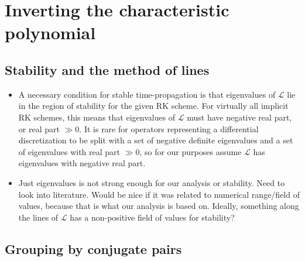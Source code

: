 \documentclass[a4paper,10pt]{article}
\begin{document}
\section{Inverting the characteristic polynomial}

\subsection{Stability and the method of lines}

{\color{blue}
\begin{itemize}

\item A necessary condition for stable time-propagation is that eigenvalues of $\mathcal{L}$
lie in the region of stability for the given RK scheme. For virtually all implicit RK schemes,
this means that eigenvalues of $\mathcal{L}$ must have negative real part, or real part
$\gg 0$. It is rare for operators representing a differential discretization to be split
with a set of negative definite eigenvalues and a set of eigenvalues with real part $\gg 0$,
so for our purposes assume $\mathcal{L}$ has eigenvalues with negative real part.

\item Just eigenvalues is not strong enough for our analysis or stability. Need to look
into literature. Would be nice if it was related to numerical range/field of values, because
that is what our analysis is based on. Ideally, something along the lines of $\mathcal{L}$ 
has a non-positive field of values for stability? 
\end{itemize}
}


\subsection{Grouping by conjugate pairs}
\end{document}

